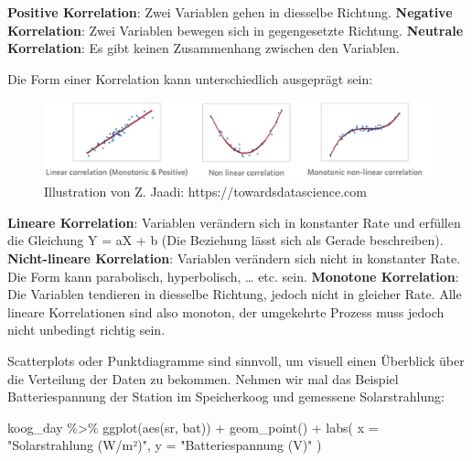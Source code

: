 \documentclass[
]{article}
\newenvironment{Shaded}{\begin{snugshade}}{\end{snugshade}}
\newcommand{\AttributeTok}[1]{\textcolor[rgb]{0.77,0.63,0.00}{#1}}
\newcommand{\FunctionTok}[1]{\textcolor[rgb]{0.00,0.00,0.00}{#1}}
\newcommand{\NormalTok}[1]{#1}
\newcommand{\SpecialCharTok}[1]{\textcolor[rgb]{0.00,0.00,0.00}{#1}}
\newcommand{\StringTok}[1]{\textcolor[rgb]{0.31,0.60,0.02}{#1}}
\begin{document}
\textbf{Positive Korrelation}: Zwei Variablen gehen in diesselbe Richtung.
\textbf{Negative Korrelation}: Zwei Variablen bewegen sich in gegengesetzte Richtung.
\textbf{Neutrale Korrelation}: Es gibt keinen Zusammenhang zwischen den Variablen.

Die Form einer Korrelation kann unterschiedlich ausgeprägt sein:

\begin{figure}

{\centering \includegraphics[width=1\linewidth]{images/056} 

}

\caption{Illustration von Z. Jaadi: https://towardsdatascience.com}\label{fig:unnamed-chunk-264}
\end{figure}

\textbf{Lineare Korrelation}: Variablen verändern sich in konstanter Rate und erfüllen die Gleichung Y = aX + b (Die Beziehung lässt sich als Gerade beschreiben).
\textbf{Nicht-lineare Korrelation}: Variablen verändern sich nicht in konstanter Rate. Die Form kann parabolisch, hyperbolisch, \ldots{} etc. sein.
\textbf{Monotone Korrelation}: Die Variablen tendieren in diesselbe Richtung, jedoch nicht in gleicher Rate. Alle lineare Korrelationen sind also monoton, der umgekehrte Prozess muss jedoch nicht unbedingt richtig sein.

Scatterplots oder Punktdiagramme sind sinnvoll, um visuell einen Überblick über die Verteilung der Daten zu bekommen. Nehmen wir mal das Beispiel Batteriespannung der Station im Speicherkoog und gemessene Solarstrahlung:

\begin{Shaded}
\begin{Highlighting}[]
\NormalTok{koog\_day }\SpecialCharTok{\%\textgreater{}\%}
  \FunctionTok{ggplot}\NormalTok{(}\FunctionTok{aes}\NormalTok{(sr, bat)) }\SpecialCharTok{+}
  \FunctionTok{geom\_point}\NormalTok{() }\SpecialCharTok{+}
  \FunctionTok{labs}\NormalTok{(}
    \AttributeTok{x =} \StringTok{"Solarstrahlung (W/m²)"}\NormalTok{,}
    \AttributeTok{y =} \StringTok{"Batteriespannung (V)"}
\NormalTok{  )}
\end{Highlighting}
\end{Shaded}
\end{document}
